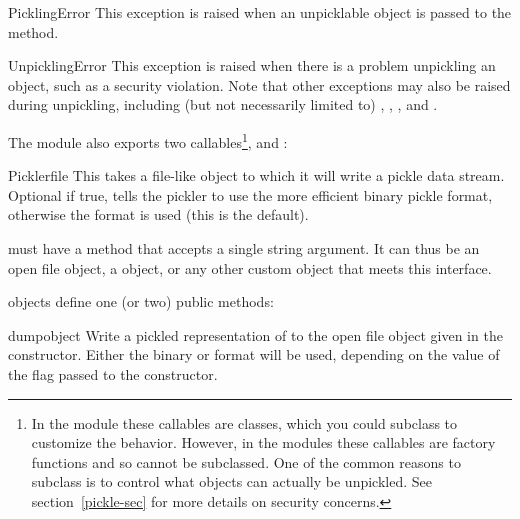\begin{excdesc}{PicklingError}
This exception is raised when an unpicklable object is passed to
the  method.
\end{excdesc}

\begin{excdesc}{UnpicklingError}
This exception is raised when there is a problem unpickling an object,
such as a security violation.  Note that other exceptions may also be
raised during unpickling, including (but not necessarily limited to)
, ,
, and .
\end{excdesc}

The  module also exports two callables\footnote{In the
 module these callables are classes, which you could
subclass to customize the behavior.  However, in the 
modules these callables are factory functions and so cannot be
subclassed.  One of the common reasons to subclass is to control what
objects can actually be unpickled.  See section~\ref{pickle-sec} for
more details on security concerns.},  and
:

\begin{classdesc}{Pickler}{file}
This takes a file-like object to which it will write a pickle data
stream.  Optional  if true, tells the pickler to use the more
efficient binary pickle format, otherwise the \ASCII{} format is used
(this is the default).

 must have a  method that accepts a single
string argument.  It can thus be an open file object, a
 object, or any other custom
object that meets this interface.
\end{classdesc}

 objects define one (or two) public methods:

\begin{methoddesc}[Pickler]{dump}{object}
Write a pickled representation of  to the open file object
given in the constructor.  Either the binary or \ASCII{} format will
be used, depending on the value of the  flag passed to the
constructor.
\end{methoddesc}

